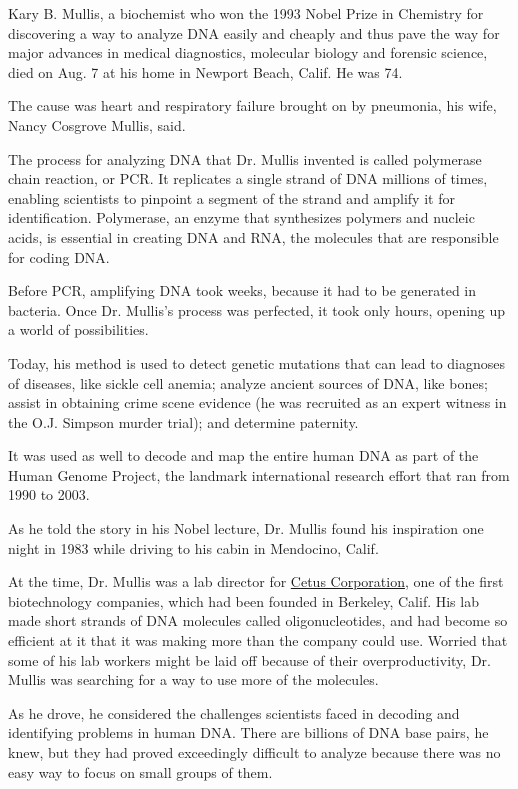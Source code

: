 Kary B. Mullis, a biochemist who won the 1993 Nobel Prize in Chemistry
for discovering a way to analyze DNA easily and cheaply and thus pave
the way for major advances in medical diagnostics, molecular biology and
forensic science, died on Aug. 7 at his home in Newport Beach, Calif. He
was 74.

The cause was heart and respiratory failure brought on by pneumonia, his
wife, Nancy Cosgrove Mullis, said.

The process for analyzing DNA that Dr. Mullis invented is called
polymerase chain reaction, or PCR. It replicates a single strand of DNA
millions of times, enabling scientists to pinpoint a segment of the
strand and amplify it for identification. Polymerase, an enzyme that
synthesizes polymers and nucleic acids, is essential in creating DNA and
RNA, the molecules that are responsible for coding DNA.

Before PCR, amplifying DNA took weeks, because it had to be generated in
bacteria. Once Dr. Mullis's process was perfected, it took only hours,
opening up a world of possibilities.

Today, his method is used to detect genetic mutations that can lead to
diagnoses of diseases, like sickle cell anemia; analyze ancient sources
of DNA, like bones; assist in obtaining crime scene evidence (he was
recruited as an expert witness in the O.J. Simpson murder trial); and
determine paternity.

It was used as well to decode and map the entire human DNA as part of
the Human Genome Project, the landmark international research effort
that ran from 1990 to 2003.

As he told the story in his Nobel lecture, Dr. Mullis found his
inspiration one night in 1983 while driving to his cabin in Mendocino,
Calif.

At the time, Dr. Mullis was a lab director for
\href{https://www.the-scientist.com/news/cetus-a-collision-course-with-failure-60308}{Cetus
Corporation}, one of the first biotechnology companies, which had been
founded in Berkeley, Calif. His lab made short strands of DNA molecules
called oligonucleotides, and had become so efficient at it that it was
making more than the company could use. Worried that some of his lab
workers might be laid off because of their overproductivity, Dr. Mullis
was searching for a way to use more of the molecules.

As he drove, he considered the challenges scientists faced in decoding
and identifying problems in human DNA. There are billions of DNA base
pairs, he knew, but they had proved exceedingly difficult to analyze
because there was no easy way to focus on small groups of them.

